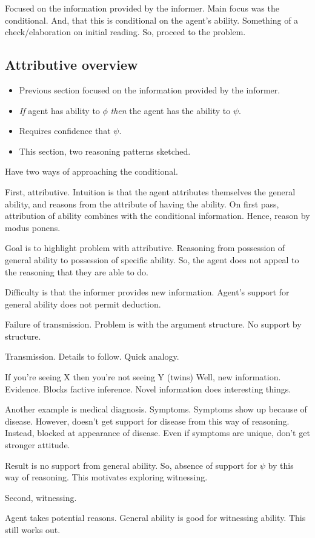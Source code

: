 \documentclass[10pt]{article}
\begin{document}
\begin{note}[Summary]
  Focused on the information provided by the informer.
  Main focus was the conditional.
  And, that this is conditional on the agent's ability.
  Something of a check/elaboration on initial reading.
  So, proceed to the problem.
\end{note}

\subsection{Attributive overview}
\label{sec:attributive-overview}

\begin{itemize}
\item Previous section focused on the information provided by the informer.
\item \emph{If} agent has ability to \(\phi\) \emph{then} the agent has the ability to \(\psi\).
\item Requires confidence that \(\psi\).
\item This section, two reasoning patterns sketched.
\end{itemize}

\begin{note}[Goals]
  Have two ways of approaching the conditional.

  First, attributive.
  Intuition is that the agent attributes themselves the general ability, and reasons from the attribute of having the ability.
  On first pass, attribution of ability combines with the conditional information.
  Hence, reason by modus ponens.

  Goal is to highlight problem with attributive.
  Reasoning from possession of general ability to possession of specific ability.
  So, the agent does not appeal to the reasoning that they are able to do.

  Difficulty is that the informer provides new information.
  Agent's support for general ability does not permit deduction.

  Failure of transmission.
  Problem is with the argument structure.
  No support by structure.

  Transmission.
  Details to follow.
  Quick analogy.

  If you're seeing X then you're not seeing Y (twins)
  Well, new information.
  Evidence.
  Blocks factive inference.
  Novel information does interesting things.

  Another example is medical diagnosis.
  Symptoms.
  Symptoms show up because of disease.
  However, doesn't get support for disease from this way of reasoning.
  Instead, blocked at appearance of disease.
  Even if symptoms are unique, don't get stronger attitude.

  Result is no support from general ability.
  So, absence of support for \(\psi\) by this way of reasoning.
  This motivates exploring witnessing.

  Second, witnessing.

  Agent takes potential reasons.
  General ability is good for witnessing ability.
  This still works out.
\end{note}
\end{document}
